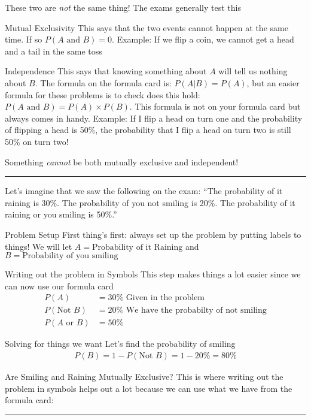 \documentclass[landscape]{article}
\newcommand{\myline}{\vspace{4pt}\hrule  \vspace{4pt}}
\newenvironment{topic}[1]{
	\noindent \textbf{\textsc{\color{harvardcrimson}{#1}}}
	\noindent \hspace{-3.5pt}
}{
	\myline
}
\newenvironment{compactdesc}{
	\begin{description}[leftmargin=1em,labelsep=0.7em, font=\normalfont\itshape]
	}{
	\end{description}
}
\begin{document}
\begin{multicols*}{3}
	\begin{topic}{Mutual Exclusivity and Independence}
		These two are \textit{not} the same thing! The exams generally test this
		\begin{compactdesc}
			\item[Mutual Exclusivity] This says that the two events cannot happen at the same time. If so $ P(A \text{ and } B) = 0 $. Example: If we flip a coin, we cannot get a head and a tail in the same toss 
			\item[Independence] This says that knowing something about $ A $ will tell us nothing about $ B $. The formula on the formula card is: $ P(A | B) = P(A) $, but an easier formula for these problems is to check does this hold: $ P(A \text{ and }  B) = P(A) \times P(B) $. This formula is not on your formula card but always comes in handy. Example: If I flip a head on turn one and the probability of flipping a head is 50\%, the probability that I flip a head on turn two is still 50\% on turn two!
		\end{compactdesc}
		Something \textit{cannot} be both mutually exclusive and independent! 
	\end{topic} 	
	\begin{topic}{Probability Example}
		Let's imagine that we saw the following on the exam: ``The probability of it raining is 30\%. The probability of you not smiling is 20\%. The probability of it raining or you smiling is 50\%.''
		\begin{compactdesc}
			\item[Problem Setup] First thing's first: always set up the problem by putting labels to things! We will let $ A = \text{Probability of it Raining} $ and $ B = \text{Probability of you smiling} $
			\item[Writing out the problem in Symbols] This step makes things a lot easier since we can now use our formula card
			\begin{align*}
			P(A) &= 30\% \text{ Given in the problem}\\
			P(\text{Not }B) &= 20\% \text{ We have the probabilty of not smiling}\\
			P(A \text{ or } B) &= 50\% 
			\end{align*} 
			\item[Solving for things we want] Let's find the probability of smiling
			\begin{align*}
			P(B) = 1 - P(\text{Not }B) = 1 - 20\% = 80\%
			\end{align*}  
			\item[Are Smiling and Raining Mutually Exclusive?] This is where writing out the problem in symbols helps out a lot because we can use what we have from the formula card:

\end{compactdesc}
\end{topic}
\end{multicols*}
\end{document}
